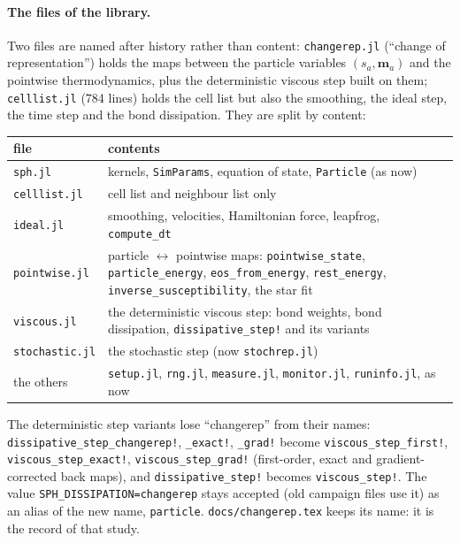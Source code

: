 \documentclass[11pt,aps,preprint,nofootinbib,superscriptaddress,tightenlines]{revtex4-2}
\newcommand{\file}[1]{\texttt{#1}}
\let\oldparagraph\paragraph
\renewcommand{\paragraph}{\par\bigskip\oldparagraph}
\begin{document}
\paragraph{The files of the library.}  Two files are named after history rather than
content: \file{changerep.jl} (``change of representation'') holds the maps between the
particle variables $(s_a,\bm m_a)$ and the pointwise thermodynamics, plus the deterministic
viscous step built on them; \file{celllist.jl} (784 lines) holds the cell list but also the
smoothing, the ideal step, the time step and the bond dissipation.  They are split by content:
\begin{center}
\begin{tabular}{lp{}}
\hline
file & contents \\ \hline
\file{sph.jl} & kernels, \file{SimParams}, equation of state, \file{Particle} (as now) \\
\file{celllist.jl} & cell list and neighbour list only \\
\file{ideal.jl} & smoothing, velocities, Hamiltonian force, leapfrog, \file{compute\_dt} \\
\file{pointwise.jl} & particle $\leftrightarrow$ pointwise maps: \file{pointwise\_state},
  \file{particle\_energy}, \file{eos\_from\_energy}, \file{rest\_energy},
  \file{inverse\_susceptibility}, the star fit \\
\file{viscous.jl} & the deterministic viscous step: bond weights, bond dissipation,
  \file{dissipative\_step!} and its variants \\
\file{stochastic.jl} & the stochastic step (now \file{stochrep.jl}) \\
the others & \file{setup.jl}, \file{rng.jl}, \file{measure.jl}, \file{monitor.jl}, \file{runinfo.jl}, as now \\
\hline
\end{tabular}
\end{center}
The deterministic step variants lose ``changerep'' from their names:
\file{dissipative\_step\_changerep!}, \file{\_exact!}, \file{\_grad!} become
\file{viscous\_step\_first!}, \file{viscous\_step\_exact!}, \file{viscous\_step\_grad!} (first-order,
exact and gradient-corrected back maps), and \file{dissipative\_step!} becomes
\file{viscous\_step!}.  The value \file{SPH\_DISSIPATION=changerep} stays accepted (old
campaign files use it) as an alias of the new name, \file{particle}.  \file{docs/changerep.tex}
keeps its name: it is the record of that study.
\end{document}
